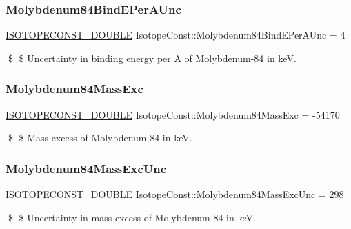 \subsubsection{\texorpdfstring{Molybdenum84\+Bind\+E\+Per\+A\+Unc}{Molybdenum84BindEPerAUnc}}
{\footnotesize\ttfamily \mbox{\hyperlink{group___isotope_const-_macros_ga8f45a7272ce02c0b4c65c44636ed719a}{I\+S\+O\+T\+O\+P\+E\+C\+O\+N\+S\+T\+\_\+\+D\+O\+U\+B\+LE}} Isotope\+Const\+::\+Molybdenum84\+Bind\+E\+Per\+A\+Unc = 4}

\$ \$ Uncertainty in binding energy per A of Molybdenum-\/84 in keV. \mbox{\label{group___isotope_const-_molybdenum-_mo84_gad0f500cb421d570e34606de73ff3737c}} 
\subsubsection{\texorpdfstring{Molybdenum84\+Mass\+Exc}{Molybdenum84MassExc}}
{\footnotesize\ttfamily \mbox{\hyperlink{group___isotope_const-_macros_ga8f45a7272ce02c0b4c65c44636ed719a}{I\+S\+O\+T\+O\+P\+E\+C\+O\+N\+S\+T\+\_\+\+D\+O\+U\+B\+LE}} Isotope\+Const\+::\+Molybdenum84\+Mass\+Exc = -\/54170}

\$ \$ Mass excess of Molybdenum-\/84 in keV. \mbox{\label{group___isotope_const-_molybdenum-_mo84_ga60fff5fe8e8a4856aec30b8b247a1cb1}} 
\subsubsection{\texorpdfstring{Molybdenum84\+Mass\+Exc\+Unc}{Molybdenum84MassExcUnc}}
{\footnotesize\ttfamily \mbox{\hyperlink{group___isotope_const-_macros_ga8f45a7272ce02c0b4c65c44636ed719a}{I\+S\+O\+T\+O\+P\+E\+C\+O\+N\+S\+T\+\_\+\+D\+O\+U\+B\+LE}} Isotope\+Const\+::\+Molybdenum84\+Mass\+Exc\+Unc = 298}

\$ \$ Uncertainty in mass excess of Molybdenum-\/84 in keV. \mbox{\label{group___isotope_const-_molybdenum-_mo84_ga82d51a5707485387092fbc1a70210ebc}} 
